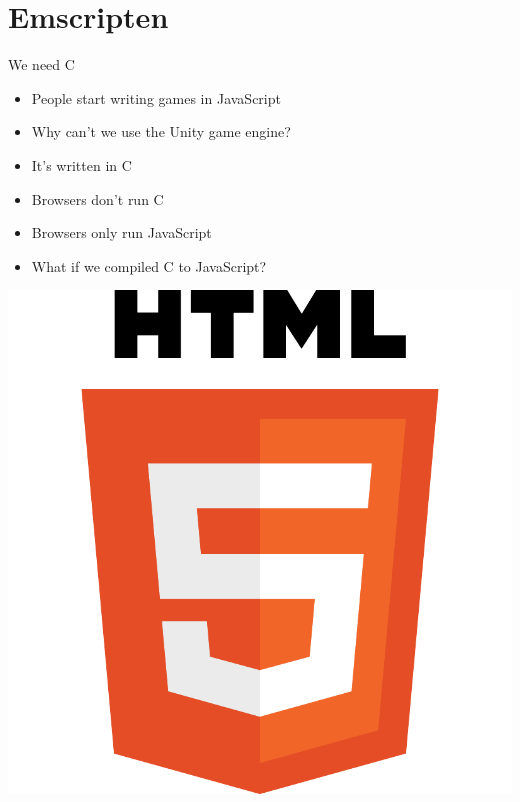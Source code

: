 \documentclass{lug}
\newcommand{\pmidg}[1]{\parbox{\widthof{#1}}{#1}}
\newcommand{\splitslide}[4]{%
    \noindent
    \begin{minipage}{#1 \textwidth - #2 }
        #3
    \end{minipage}%
    \hspace{ \dimexpr #2 * 2 \relax }%
    \begin{minipage}{\textwidth - #1 \textwidth - #2 }
        #4
    \end{minipage}
}
\begin{document}
\renewcommand{\secimage}{graphics/emscripten_icon}
\section{Emscripten}

\begin{frame}{We need C}
    \splitslide{0.75}{1em}{\begin{itemize}
        \item People start writing games in JavaScript
        \item Why can't we use the Unity game engine?
        \item It's written in C
        \item Browsers don't run C
        \item Browsers only run JavaScript
        \item What if we compiled C to JavaScript?
    \end{itemize}}{\pmidg{
        \includegraphics[width=\columnwidth]{graphics/html5_logo} \\
        \vspace{1cm} \\
}}
\end{frame}
\end{document}
